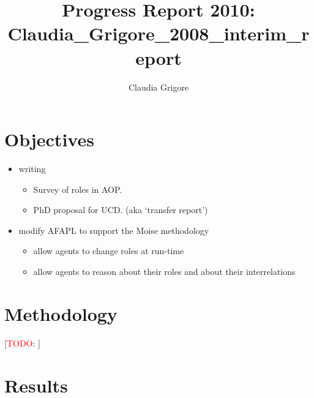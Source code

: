 \documentclass{article}
\title{Progress Report 2010: Claudia\_Grigore\_2008\_interim\_report}
\author{Claudia Grigore}
\newcommand{\todo}[1]{[\textcolor{red}{TODO}: #1]}
\begin{document}
 \maketitle

\section{Objectives}

\begin{itemize}
\item writing
  \begin{itemize}
  \item Survey of roles in AOP.
  \item PhD proposal for UCD. (aka `transfer report')
  \end{itemize}
\item modify AFAPL to support the Moise methodology
  \begin{itemize}
  \item allow agents to change roles at run-time
  \item allow agents to reason about their roles and about their interrelations
  \end{itemize}
\end{itemize}


\section{Methodology}

\todo{}

\section{Results}
\end{document}
